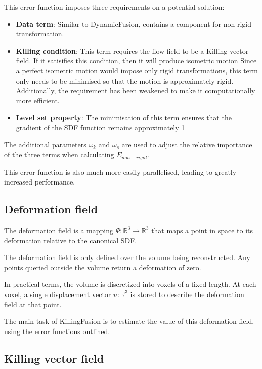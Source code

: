 \documentclass[12pt,twoside]{report}
\begin{document}
This error function imposes three requirements on a potential solution:
\begin{itemize}
\item \textbf{Data term}: Similar to DynamicFusion, contains a component for non-rigid transformation.
\item \textbf{Killing condition}: This term requires the flow field to be a Killing vector field. If it satisifies this condition, then it will produce isometric motion Since a perfect isometric motion would impose only rigid transformations, this term only needs to be minimised so that the motion is approximately rigid. Additionally, the requirement has been weakened to make it computationally more efficient.
\item \textbf{Level set property}: The minimisation of this term ensures that the gradient of the SDF function remains approximately 1
\end{itemize}

The additional parameters $\omega_k$ and $\omega_s$ are used to adjust the relative importance of the three terms when calculating $E_{non-rigid}$.

This error function is also much more easily parallelised, leading to greatly increased performance.\\



\subsection{Deformation field}

The deformation field is a mapping $\Psi : \mathbb{R}^3 \rightarrow \mathbb{R}^3$ that maps a point in space to its deformation relative to the canonical SDF.

The deformation field is only defined over the volume being reconstructed. Any points queried outside the volume return a deformation of zero.

In practical terms, the volume is discretized into voxels of a fixed length. At each voxel, a single displacement vector $u : \mathbb{R}^3$ is stored to describe the deformation field at that point.

The main task of KillingFusion is to estimate the value of this deformation field, using the error functions outlined.

\subsection{Killing vector field}
\end{document}
